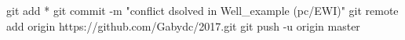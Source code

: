 git add *
git commit -m "conflict dsolved in  Well_example (pc/EWI)"
git remote add origin https://github.com/Gabydc/2017.git
git push -u origin master
